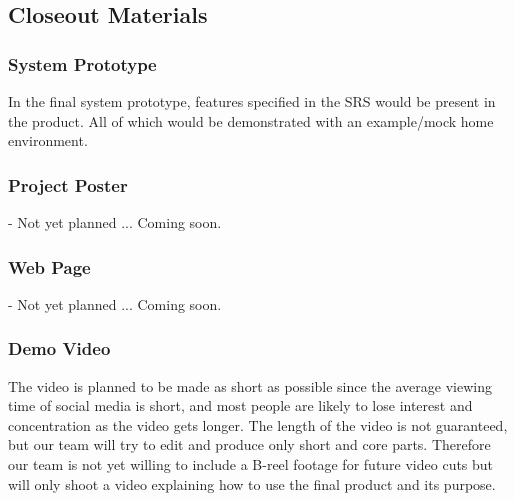\subsection{Closeout Materials}

\subsubsection{System Prototype}
 In the final system prototype, features specified in the SRS would be present in the product. All of which would be demonstrated with an example/mock home environment.

\subsubsection{Project Poster}
- Not yet planned ... Coming soon.

\subsubsection{Web Page}
- Not yet planned ... Coming soon.%


\subsubsection{Demo Video}
The video is planned to be made as short as possible since the average viewing time of social media is short, and most people are likely to lose interest and concentration as the video gets longer. The length of the video is not guaranteed, but our team will try to edit and produce only short and core parts. Therefore our team is not yet willing to include a B-reel footage for future video cuts but will only shoot a video explaining how to use the final product and its purpose.


